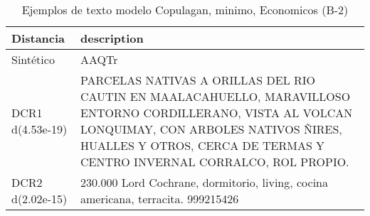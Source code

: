 \begin{table}[H]
\centering
\fontsize{10}{14}\selectfont
\caption{Ejemplos de texto modelo Copulagan, minimo, Economicos (B-2)}
\label{table-example-economicos-b-2-copulagan-min-text}
\begin{tabular}{|l|m{35em}|}
\hline
\rowcolor[gray]{0.8}
Distancia & description \\
\hline Sintético & AAQTr \\
\hline DCR1 d(4.53e-19) & PARCELAS NATIVAS A ORILLAS DEL RIO CAUTIN EN MAALACAHUELLO, MARAVILLOSO ENTORNO CORDILLERANO, VISTA AL VOLCAN LONQUIMAY, CON ARBOLES NATIVOS \~NIRES, HUALLES Y OTROS, CERCA DE TERMAS Y CENTRO INVERNAL CORRALCO, ROL PROPIO. \\
\hline DCR2 d(2.02e-15) & 230.000 Lord Cochrane, dormitorio, living, cocina americana, terracita. 999215426 \\
\hline
\end{tabular}
\end{table}
